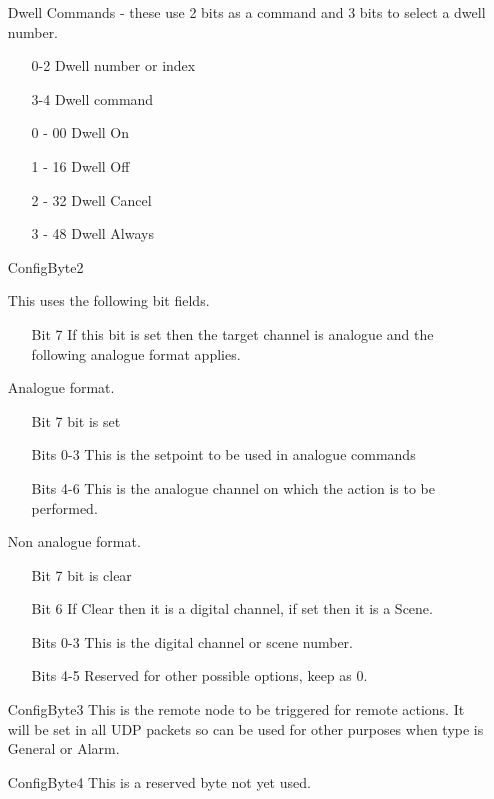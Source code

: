 \begin{enumerate}
        Dwell Commands - these use 2 bits as a command and 3 bits to select a dwell number.

            \begin{enumerate}
            \item[0-2] Dwell number or index
            \item[3-4] Dwell command
            \end{enumerate}
            
            \begin{enumerate}
            \item[0 - 00] Dwell On
            \item[1 - 16] Dwell Off
            \item[2 - 32] Dwell Cancel
            \item[3 - 48] Dwell Always
            \end{enumerate}

    \item[ConfigByte2]

    This uses the following bit fields.
        \begin{enumerate}
        \item[Bit 7] If this bit is set then the target channel is analogue and the following analogue 
            format applies.
        \end{enumerate}
        Analogue format.
        \begin{enumerate}
        \item[Bit 7] bit is set
        \item[Bits 0-3] This is the setpoint to be used in analogue commands
        \item[Bits 4-6] This is the analogue channel on which the action is to be performed.
        \end{enumerate}
        Non analogue format.
        \begin{enumerate}
        \item[Bit 7] bit is clear
        \item[Bit 6] If Clear then it is a digital channel, if set then it is a Scene.
        \item[Bits 0-3] This is the digital channel or scene number.
        \item[Bits 4-5] Reserved for other possible options, keep as 0.
        \end{enumerate}

    \item[ConfigByte3]
    This is the remote node to be triggered for remote actions. It will be set in all
    UDP packets so can be used for other purposes when type is General or Alarm.

    \item[ConfigByte4]
    This is a reserved byte not yet used.
    \end{enumerate}

